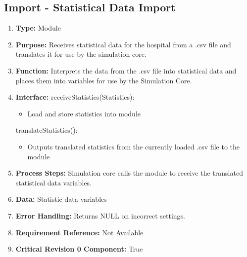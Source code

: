 \documentclass[paper=letter, fontsize=10pt]{scrartcl}
\numberwithin{equation}{section}		%
\numberwithin{figure}{section}			%
\numberwithin{table}{section}				%
\begin{document}
\subsection{Import - Statistical Data Import}
\begin{enumerate}[]
	\item \textbf{Type:} Module
	\item \textbf{Purpose:} Receives statistical data for the hospital from a .csv file and translates it for use by the simulation core.
	\item \textbf{Function:} Interprets the data from the .csv file into statistical data and places them into variables for use by the Simulation Core.  
	\item \textbf{Interface:} \newline
	receiveStatistics(Statistics):
	 	\begin{itemize}
	 		\item Load and store statistics into module
	 	\end{itemize}
	 translateStatistics():
	 	\begin{itemize}
	 		\item Outputs translated statistics from the currently loaded .csv file to the module
	 	\end{itemize}
	\item \textbf{Process Steps:} Simulation core calls the module to receive the translated statistical data variables.
	\item \textbf{Data:} Statistic data variables
	\item \textbf{Error Handling:} Returns NULL on incorrect settings.
	\item \textbf{Requirement Reference:} Not Available
	\item \textbf{Critical Revision 0 Component:} True
\end{enumerate}
\end{document}
